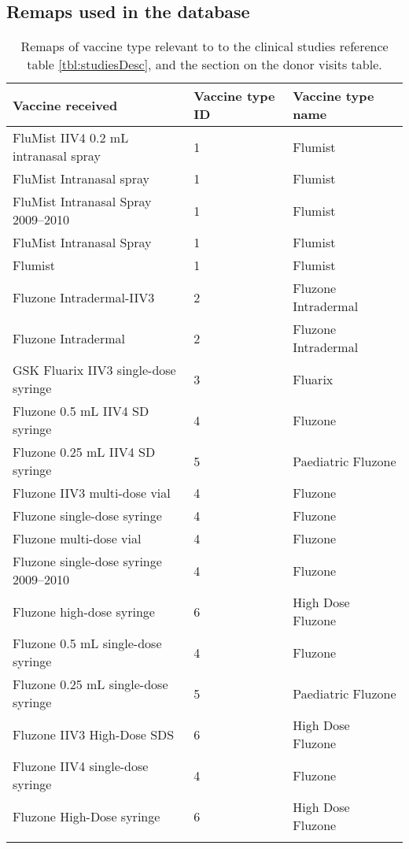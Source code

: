 \begin{appendices}
    \section{Remaps used in the database}

    \begin{table}[h]
        \begin{tabular}{lll}
            \toprule{}
            Vaccine received & Vaccine type ID & Vaccine type name \\
            \midrule{}
            FluMist IIV4 0.2 mL intranasal spray & 1 & Flumist \\
            FluMist Intranasal spray & 1 & Flumist \\
            FluMist Intranasal Spray 2009–2010 & 1 & Flumist \\
            FluMist Intranasal Spray & 1 & Flumist \\
            Flumist & 1 & Flumist \\
            Fluzone Intradermal-IIV3 & 2 & Fluzone Intradermal \\
            Fluzone Intradermal & 2 & Fluzone Intradermal \\
            GSK Fluarix IIV3 single-dose syringe & 3 & Fluarix \\
            Fluzone 0.5 mL IIV4 SD syringe & 4 & Fluzone \\
            Fluzone 0.25 mL IIV4 SD syringe & 5 & Paediatric Fluzone \\
            Fluzone IIV3 multi-dose vial & 4 & Fluzone \\
            Fluzone single-dose syringe & 4 & Fluzone \\
            Fluzone multi-dose vial & 4 & Fluzone \\
            Fluzone single-dose syringe 2009–2010 & 4 & Fluzone \\
            Fluzone high-dose syringe & 6 & High Dose Fluzone \\
            Fluzone 0.5 mL single-dose syringe & 4 & Fluzone \\
            Fluzone 0.25 mL single-dose syringe & 5 & Paediatric Fluzone \\
            Fluzone IIV3 High-Dose SDS & 6 & High Dose Fluzone \\
            Fluzone IIV4 single-dose syringe & 4 & Fluzone \\
            Fluzone High-Dose syringe & 6 & High Dose Fluzone \\
            \bottomrule{}
        \end{tabular}
        \caption{Remaps of vaccine type relevant to to the clinical studies
        reference table \autoref{tbl:studiesDesc}, and the section on the donor
        visits table.}\label{tbl:remapVaccine}
    \end{table}


\end{appendices}
